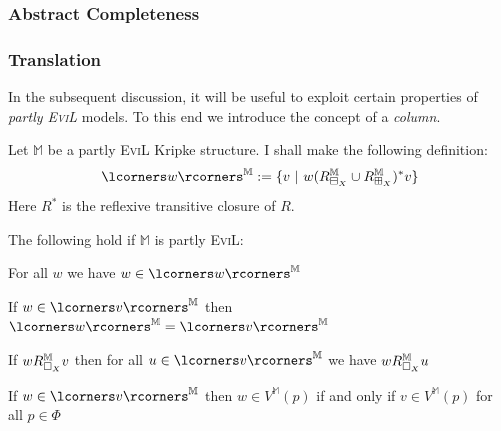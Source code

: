 \subsubsection{Abstract Completeness}
\label{Abstract-Completeness}

%
\subsubsection{Translation}\label{translation}

In the subsequent discussion, it will be useful to exploit certain properties of \emph{partly \textsc{EviL}} models.  To this end we introduce the concept of a \emph{column}.

\begin{mydef}Let $\mathbb{M}$ be a partly \textsc{EviL} Kripke structure.  I shall make the following definition:
\[ \lcorners w\rcorners^\mathbb{M} := \{ v\ |\ w (R^{\mathbb{M}}_{\BB_X}\cup R^{\mathbb{M}}_{\BBI_X})^\ast v \}\]
Here $R^\ast$ is the reflexive transitive closure of $R$.
\end{mydef}

\begin{lemma}\label{column}
The following hold if $\mathbb{M}$ is partly \textsc{EviL}:
\begin{mynum}
	\item For all $w$ we have $w \in \lcorners w\rcorners^\mathbb{M}$
	\item If $w \in \lcorners v\rcorners^\mathbb{M}$ then $\lcorners w\rcorners^\mathbb{M} = \lcorners v\rcorners^\mathbb{M}$
	\item If $w R^\mathbb{M}_{\Box_X} v$ then for all $u \in \lcorners v\rcorners^\mathbb{M}$ we have $w R^\mathbb{M}_{\Box_X} u$
	\item If $w \in \lcorners v\rcorners^\mathbb{M}$ then $w\in V^\mathbb{M}(p)$ if and only if $v \in V^\mathbb{M}(p)$ for all $p \in \Phi$
\end{mynum}

\end{lemma}

